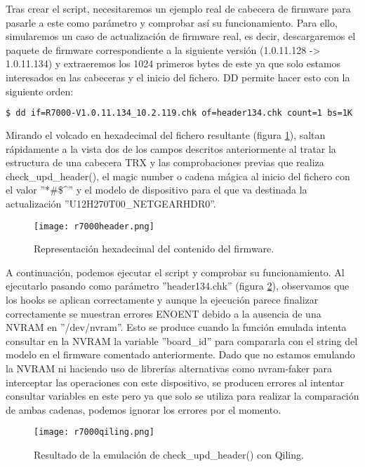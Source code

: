 Tras crear el script, necesitaremos un ejemplo real de cabecera de firmware para pasarle a este como parámetro y comprobar así
su funcionamiento. Para ello, simularemos un caso de actualización de firmware real, es decir, descargaremos el paquete de 
firmware correspondiente a la siguiente versión (1.0.11.128 -> 1.0.11.134) y extraeremos los 1024 primeros bytes de este ya que 
solo estamos interesados en las cabeceras y el inicio del fichero. DD permite hacer esto con la siguiente orden:

\begin{lstlisting}[language=bash, breaklines]
    $ dd if=R7000-V1.0.11.134_10.2.119.chk of=header134.chk count=1 bs=1K
\end{lstlisting}

Mirando el volcado en hexadecimal del fichero resultante (figura \ref{fig:R7000header}), saltan rápidamente a la vista dos de
los campos descritos anteriormente al tratar la estructura de una cabecera TRX y las comprobaciones previas que realiza 
check\_upd\_header(), el magic number o cadena mágica al inicio del fichero con el valor ''*\#\$\textasciicircum'' y el modelo de dispositivo
para el que va destinada la actualización ''U12H270T00\_NETGEARHDR0''.

\begin{figure}[H]
    \centering
    \texttt{[image: r7000header.png]}
    \caption{Representación hexadecimal del contenido del firmware.}
    \label{fig:R7000header}
\end{figure}

A continuación, podemos ejecutar el script y comprobar su funcionamiento. Al ejecutarlo pasando como parámetro 
''header134.chk'' (figura \ref{fig:R7000qiling}), observamos que los hooks se aplican correctamente y aunque la ejecución 
parece finalizar correctamente se muestran errores ENOENT debido a la ausencia de una NVRAM en ''/dev/nvram''. Esto se produce cuando la función emulada
intenta consultar en la NVRAM la variable ''board\_id'' para compararla con el string del modelo en el firmware comentado
anteriormente. Dado que no estamos emulando la NVRAM ni haciendo uso de librerías alternativas como nvram-faker\cite{nvram}
para interceptar las operaciones con este dispositivo, se producen errores al intentar consultar variables en este pero ya
que solo se utiliza para realizar la comparación de ambas cadenas, podemos ignorar los errores por el momento.

\begin{figure}[H]
    \centering
    \texttt{[image: r7000qiling.png]}
    \caption{Resultado de la emulación de check\_upd\_header() con Qiling.}
    \label{fig:R7000qiling}
\end{figure}

